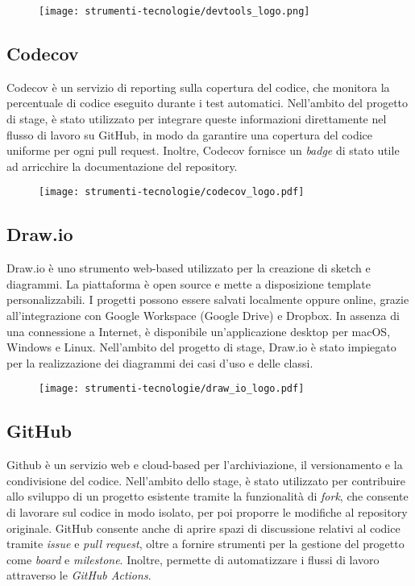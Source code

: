 \begin{figure}[H]
    \centering 
    \texttt{[image: strumenti-tecnologie/devtools\_logo.png]} 
\end{figure}

\subsection*{Codecov}

\par Codecov è un servizio di reporting sulla copertura del codice, che monitora la percentuale di codice eseguito durante i test automatici. Nell’ambito del progetto di stage, è stato utilizzato per integrare queste informazioni direttamente nel flusso di lavoro su GitHub, in modo da garantire una copertura del codice uniforme per ogni pull request. Inoltre, Codecov fornisce un \textit{badge} di stato utile ad arricchire la documentazione del repository.

\begin{figure}[H]
    \centering 
    \texttt{[image: strumenti-tecnologie/codecov\_logo.pdf]} 
\end{figure}

\subsection*{Draw.io}

\par Draw.io è uno strumento web-based utilizzato per la creazione di sketch e diagrammi. La piattaforma è open source e mette a disposizione template personalizzabili. I progetti possono essere salvati localmente oppure online, grazie all’integrazione con Google Workspace (Google Drive) e Dropbox. In assenza di una connessione a Internet, è disponibile un'applicazione desktop per macOS, Windows e Linux. Nell’ambito del progetto di stage, Draw.io è stato impiegato per la realizzazione dei diagrammi dei casi d’uso e delle classi.

\begin{figure}[H]
    \centering 
    \texttt{[image: strumenti-tecnologie/draw\_io\_logo.pdf]} 
\end{figure}

\subsection*{GitHub}

\par Github è un servizio web e cloud-based per l'archiviazione, il versionamento e la condivisione del codice. Nell’ambito dello stage, è stato utilizzato per contribuire allo sviluppo di un progetto esistente tramite la funzionalità di \textit{fork}, che consente di lavorare sul codice in modo isolato, per poi proporre le modifiche al repository originale. GitHub consente anche di aprire spazi di discussione relativi al codice tramite \textit{issue} e \textit{pull request}, oltre a fornire strumenti per la gestione del progetto come \textit{board} e \textit{milestone}. Inoltre, permette di automatizzare i flussi di lavoro attraverso le \textit{GitHub Actions}.

